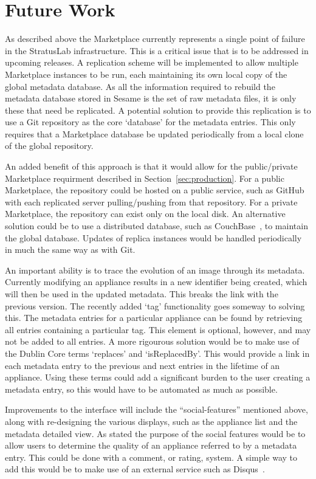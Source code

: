 \section{Future Work}
\label{sec:future-work}
As described above the Marketplace currently represents a single point of failure in the StratusLab infrastructure. This is a critical issue that is to be addressed in upcoming releases. A replication scheme will be implemented to allow multiple Marketplace instances to be run, each maintaining its own local copy of the global metadata database. As all the information required to rebuild the metadata database stored in Sesame is the set of raw metadata files, it is only these that need be replicated. A potential solution to provide this replication is to use a Git repository as the core `database' for the metadata entries. This only requires that a Marketplace database be updated periodically from a local clone of the global repository. 

An added benefit of this approach is that it would allow for the public/private Marketplace requirment described in Section~\ref{sec:production}. For a public Marketplace, the repository could be hosted on a public service, such as GitHub~\cite{github} with each replicated server pulling/pushing from that repository.  For a private Marketplace, the repository can exist only on the local disk. An alternative solution could be to use a distributed database, such as CouchBase~\cite{couchbase}, to maintain the global database. Updates of replica instances would be handled periodically in much the same way as with Git.

An important ability is to trace the evolution of an image through its metadata. Currently modifying an appliance results in a new identifier being created, which will then be used in the updated metadata. This breaks the link with the previous version. The recently added `tag' functionality goes someway to solving this.  The metadata entries for a particular appliance can be found by retrieving all entries containing a particular tag. This element is optional, however, and may not be added to all entries. A more rigourous solution would be to make use of the Dublin Core terms `replaces' and `isReplacedBy'. This would provide a link in each metadata entry to the previous and next entries in the lifetime of an appliance. Using these terms could add a significant burden to the user creating a metadata entry, so this would have to be automated as much as possible.

Improvements to the interface will include the ``social-features'' mentioned above, along with re-designing the various displays, such as the appliance list and the metadata detailed view. As stated the purpose of the social features would be to allow users to determine the quality of an appliance referred to by a metadata entry. This could be done with a comment, or rating, system. A simple way to add this would be to make use of an external service such as Disqus~\cite{disqus}.
